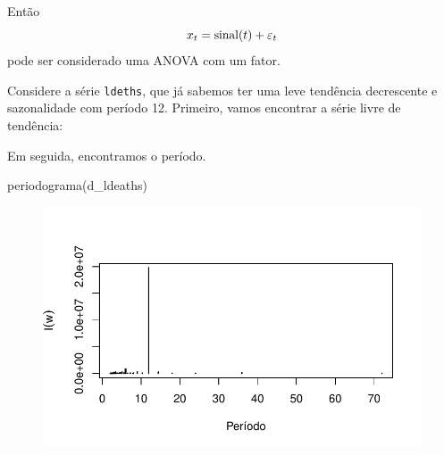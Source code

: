 \documentclass[
  letterpaper,
  DIV=11,
  numbers=noendperiod]{scrreprt}
\newenvironment{Shaded}{\begin{snugshade}}{\end{snugshade}}
\newcommand{\AttributeTok}[1]{\textcolor[rgb]{0.40,0.45,0.13}{#1}}
\newcommand{\CommentTok}[1]{\textcolor[rgb]{0.37,0.37,0.37}{#1}}
\newcommand{\DecValTok}[1]{\textcolor[rgb]{0.68,0.00,0.00}{#1}}
\newcommand{\FunctionTok}[1]{\textcolor[rgb]{0.28,0.35,0.67}{#1}}
\newcommand{\NormalTok}[1]{\textcolor[rgb]{0.00,0.23,0.31}{#1}}
\newcommand{\OtherTok}[1]{\textcolor[rgb]{0.00,0.23,0.31}{#1}}
\newcommand{\SpecialCharTok}[1]{\textcolor[rgb]{0.37,0.37,0.37}{#1}}
\begin{document}
Então \[x_t=\hbox{sinal}(t)+\varepsilon_t\] pode ser considerado uma
ANOVA com um fator.

Considere a série \texttt{ldeths}, que já sabemos ter uma leve tendência
decrescente e sazonalidade com período 12. Primeiro, vamos encontrar a
série livre de tendência:

\begin{Shaded}
\end{Shaded}

Em seguida, encontramos o período.

\begin{Shaded}
\begin{Highlighting}[]
\FunctionTok{periodograma}\NormalTok{(d\_ldeaths)}
\end{Highlighting}
\end{Shaded}

\begin{figure}[H]

{\centering \includegraphics{ferramentas_files/figure-pdf/unnamed-chunk-17-1.pdf}

}

\end{figure}
\end{document}
